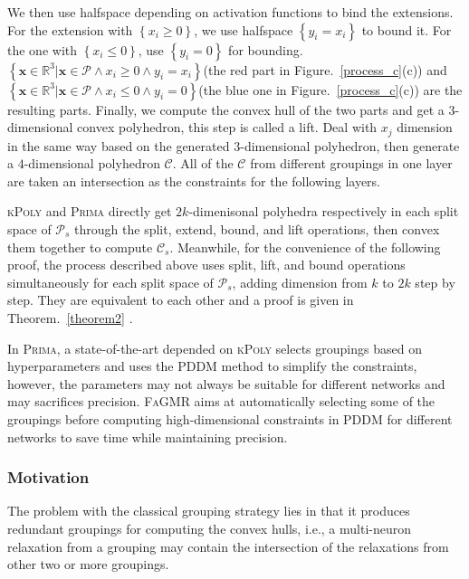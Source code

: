 \documentclass[runningheads]{llncs}
\newcommand{\ourtool}{\textsc{FaGMR}\xspace}
\newcommand{\prima}{\textsc{Prima}\xspace}
\newcommand{\krelu}{\textsc{kPoly}\xspace}
\newcommand{\myvec}[1]{\boldsymbol{#1}}
\begin{document}
We then use halfspace depending on activation functions to bind the extensions. For the extension with $\left\{ x_{i} \geq 0 \right\}$, we use halfspace $\left\{ y_{i}=x_{i} \right\}$ to bound it. For the one with $\left\{x_{i} \leq 0 \right\}$, use $\left\{ y_{i} = 0\right\}$ for bounding. $\left\{ \myvec{x} \in \mathbb{R}^{3} | \myvec{x} \in \mathcal{P} \wedge x_{i} \geq 0 \wedge y_{i} = x_{i} \right\}$(the red part in Figure.~\ref{process_c}(c))
and $\left\{ \myvec{x} \in \mathbb{R}^{3} | \myvec{x} \in \mathcal{P} \wedge x_{i} \leq 0 \wedge y_{i} = 0 \right\}$(the blue one in Figure.~\ref{process_c}(c)) are the resulting parts.
Finally, we compute the convex hull of the two parts and get a $3$-dimensional convex polyhedron, this step is called a lift. Deal with $x_{j}$ dimension in the same way based on the generated $3$-dimensional polyhedron, then generate a $4$-dimensional polyhedron $\mathcal{C}$. All of the $\mathcal{C}$ from different groupings in one layer are taken an intersection as the constraints for the following layers.

\krelu and \prima directly get $2k$-dimenisonal polyhedra respectively in each split space of $\mathcal{P}_{s}$ through the split, extend, bound, and lift operations, then convex them together to compute $\mathcal{C}_{s}$. Meanwhile, for the convenience of the following proof, the process described above uses split, lift, and bound operations simultaneously for each split space of $\mathcal{P}_{s}$, adding dimension from $k$ to $2k$ step by step. They are equivalent to each other and a proof is given in Theorem.~\ref{theorem2} .

 In \prima, a state-of-the-art depended on \krelu selects groupings based on hyperparameters and uses the PDDM method to simplify the constraints, however, the parameters may not always be suitable for different networks and may sacrifices precision. \ourtool aims at automatically selecting some of the groupings before computing high-dimensional constraints in PDDM for different networks to save time while maintaining precision. 

%
%
%
\subsubsection{Motivation}
The problem with the classical grouping strategy lies in that it produces
redundant groupings for computing the convex hulls, i.e., a multi-neuron relaxation from a grouping may contain the intersection of the relaxations from other two or more groupings. 
\end{document}
